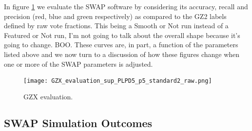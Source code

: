 \documentclass[twocolumn]{aastex6}
\begin{document}
In figure \ref{fig:swapeval} we evaluate the SWAP software by considering
its accuracy, recall and precision (red, blue and green respectively) as compared 
to the GZ2 labels defined by raw vote fractions.  This being a Smooth or Not run
instead of a Featured or Not run, I'm not going to talk about the overall shape
because it's going to change. BOO. These curves are, in part, a 
function of the parameters listed above and we now turn to a discussion of 
how these figures change when one or more of the SWAP parameters is adjusted. 


\begin{figure}[t!]
\texttt{[image: GZX\_evaluation\_sup\_PLPD5\_p5\_standard2\_raw.png]}
\caption{GZX evaluation. \label{fig:swapeval}}
\end{figure}

\subsection{SWAP Simulation Outcomes}
\end{document}
